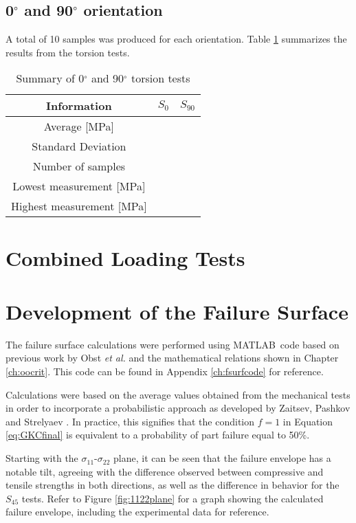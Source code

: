 \documentclass[main.tex]{subfiles}
\begin{document}
\subsection{0$^\circ$ and 90$^\circ$ orientation} \label{ssec:090r}

A total of 10 samples was produced for each orientation. Table \ref{tab:tors090r} summarizes the results from the torsion tests.

\begin{table} [h]
	\centering
	\caption{Summary of 0$^\circ$ and 90$^\circ$ torsion tests}
\begin{tabular}{ c| c c } 
	\toprule
	\textbf{Information} & $S_{0}$ & $S_{90}$\\
	\midrule
	Average [MPa] &  & \\
	Standard Deviation & & \\
	Number of samples &  & \\
	Lowest measurement [MPa] &  & \\
	Highest measurement [MPa] & & \\
	\bottomrule
\end{tabular}
\label{tab:tors090r}
\end{table}

\section{Combined Loading Tests} \label{sec:clr}
\section{Development of the Failure Surface} \label{sec:fsc}

The failure surface calculations were performed using MATLAB\textregistered~code based on previous work by Obst \emph{et al.} \cite{Obst2018} and the mathematical relations shown in Chapter \ref{ch:oocrit}. This code can be found in Appendix \ref{ch:fsurfcode} for reference.

Calculations were based on the average values obtained from the mechanical tests in order to incorporate a probabilistic approach as developed by Zaitsev, Pashkov and Strelyaev \cite{Zaitsev1975}. In practice, this signifies that the condition $f=1$ in Equation \ref{eq:GKCfinal} is equivalent to a probability of part failure equal to 50\%.

Starting with the $\sigma_{11}$-$\sigma_{22}$ plane, it can be seen that the failure envelope has a notable tilt, agreeing with the difference observed between compressive and tensile strengths in both directions, as well as the difference in behavior for the $S_{45}$ tests. Refer to Figure \ref{fig:1122plane} for a graph showing the calculated failure envelope, including the experimental data for reference.
\end{document}

